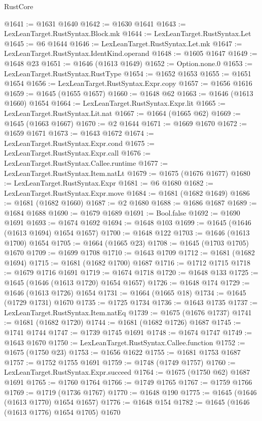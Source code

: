 \begin{lexlean}{RustCore}
\begin{coremodule}
@1641 := @1631 @1640
@1642 := @1630 @1641
@1643 := LexLeanTarget.RustSyntax.Block.mk
@1644 := LexLeanTarget.RustSyntax.Let
@1645 := @6 @1644
@1646 := LexLeanTarget.RustSyntax.Let.mk
@1647 := LexLeanTarget.RustSyntax.IdentKind.operand
@1648 := @1605 @1647
@1649 := @1648 @23
@1651 := @1646 (@1613 @1649)
@1652 := Option.none.{0}
@1653 := LexLeanTarget.RustSyntax.RustType
@1654 := @1652 @1653
@1655 := @1651 @1654
@1656 := LexLeanTarget.RustSyntax.Expr.copy
@1657 := @1656 @1616
@1659 := @1645 (@1655 @1657)
@1660 := @1648 @62
@1663 := @1646 (@1613 @1660) @1654
@1664 := LexLeanTarget.RustSyntax.Expr.lit
@1665 := LexLeanTarget.RustSyntax.Lit.nat
@1667 := @1664 (@1665 @62)
@1669 := @1645 (@1663 @1667)
@1670 := @2 @1644
@1671 := @1669 @1670
@1672 := @1659 @1671
@1673 := @1643 @1672
@1674 := LexLeanTarget.RustSyntax.Expr.cond
@1675 := LexLeanTarget.RustSyntax.Expr.call
@1676 := LexLeanTarget.RustSyntax.Callee.runtime
@1677 := LexLeanTarget.RustSyntax.Item.natLt
@1679 := @1675 (@1676 @1677)
@1680 := LexLeanTarget.RustSyntax.Expr
@1681 := @6 @1680
@1682 := LexLeanTarget.RustSyntax.Expr.move
@1684 := @1681 (@1682 @1649)
@1686 := @1681 (@1682 @1660)
@1687 := @2 @1680
@1688 := @1686 @1687
@1689 := @1684 @1688
@1690 := @1679 @1689
@1691 := Bool.false
@1692 := @1690 @1691
@1693 := @1674 @1692
@1694 := @1648 @103
@1699 := @1645 (@1646 (@1613 @1694) @1654 @1657)
@1700 := @1648 @122
@1703 := @1646 (@1613 @1700) @1654
@1705 := @1664 (@1665 @23)
@1708 := @1645 (@1703 @1705) @1670
@1709 := @1699 @1708
@1710 := @1643 @1709
@1712 := @1681 (@1682 @1694)
@1715 := @1681 (@1682 @1700) @1687
@1716 := @1712 @1715
@1718 := @1679 @1716 @1691
@1719 := @1674 @1718
@1720 := @1648 @133
@1725 := @1645 (@1646 (@1613 @1720) @1654 @1657)
@1726 := @1648 @174
@1729 := @1646 (@1613 @1726) @1654
@1731 := @1664 (@1665 @18)
@1734 := @1645 (@1729 @1731) @1670
@1735 := @1725 @1734
@1736 := @1643 @1735
@1737 := LexLeanTarget.RustSyntax.Item.natEq
@1739 := @1675 (@1676 @1737)
@1741 := @1681 (@1682 @1720)
@1744 := @1681 (@1682 @1726) @1687
@1745 := @1741 @1744
@1747 := @1739 @1745 @1691
@1748 := @1674 @1747
@1749 := @1643 @1670
@1750 := LexLeanTarget.RustSyntax.Callee.function
@1752 := @1675 (@1750 @23)
@1753 := @1656 @1622
@1755 := @1681 @1753 @1687
@1757 := @1752 @1755 @1691
@1759 := @1748 (@1749 @1757)
@1760 := LexLeanTarget.RustSyntax.Expr.succeed
@1764 := @1675 (@1750 @62) @1687 @1691
@1765 := @1760 @1764
@1766 := @1749 @1765
@1767 := @1759 @1766
@1769 := @1719 (@1736 @1767)
@1770 := @1648 @190
@1775 := @1645 (@1646 (@1613 @1770) @1654 @1657)
@1776 := @1648 @154
@1782 := @1645 (@1646 (@1613 @1776) @1654 @1705) @1670

\end{coremodule}
\end{lexlean}
